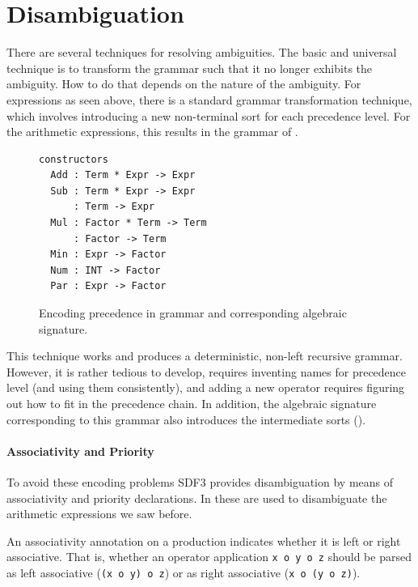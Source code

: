 \section{Disambiguation}

There are several techniques for resolving ambiguities. The basic and universal
technique is to transform the grammar such that it no longer exhibits the
ambiguity. How to do that depends on the nature of the ambiguity. For
expressions as seen above, there is a standard grammar transformation technique,
which involves introducing a new non-terminal sort for each precedence level.
For the arithmetic expressions, this results in the grammar of
.

\begin{figure}

\begin{lstlisting}[language=Stratego]
constructors
  Add : Term * Expr -> Expr
  Sub : Term * Expr -> Expr
      : Term -> Expr
  Mul : Factor * Term -> Term
      : Factor -> Term
  Min : Expr -> Factor
  Num : INT -> Factor
  Par : Expr -> Factor
\end{lstlisting}
\caption{Encoding precedence in grammar and corresponding algebraic signature.}
\end{figure}

This technique works and produces a deterministic, non-left recursive grammar.
However, it is rather tedious to develop, requires inventing names for
precedence level (and using them consistently), and adding a new operator
requires figuring out how to fit in the precedence chain. In addition, the
algebraic signature corresponding to this grammar also introduces the
intermediate sorts ().

\paragraph{Associativity and Priority}

To avoid these encoding problems SDF3 provides disambiguation by means of
associativity and priority declarations. 
In  these are used to disambiguate the
arithmetic expressions we saw before.

An associativity annotation on a production indicates whether it is left or
right associative. That is, whether an operator application \texttt{x o y o z}
should be parsed as left associative (\texttt{(x o y) o z}) or as right
associative (\texttt{x o (y o z)}).

